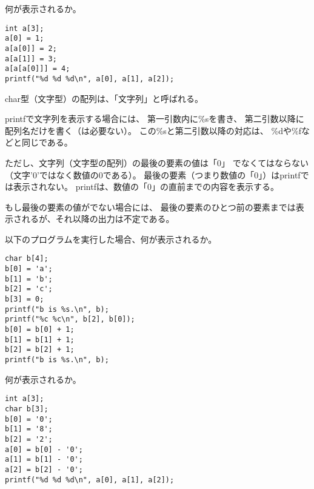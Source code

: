 \documentclass[12pt,a4j]{jarticle}
\newcounter{toi}
\def\toi{%
\bigskip\bigskip\noindent
\addtocounter{toi}{1}
\shadowbox{\bfseries\large 問\thetoi}
\nopagebreak[4]\bigskip\nopagebreak[4]
}
\begin{document}
何が表示されるか。
\begin{verbatim}
int a[3];
a[0] = 1;
a[a[0]] = 2;
a[a[1]] = 3;
a[a[a[0]]] = 4;
printf("%d %d %d\n", a[0], a[1], a[2]);
\end{verbatim}








\toi


char型（文字型）の配列は、「{\ttfamily 文字列}」と呼ばれる。



{\ttfamily printf}で文字列を表示する場合には、
第一引数内に{\ttfamily \%s}を書き、
第二引数以降に配列名だけを書く（{\ttfamily []}は必要ない）。
この{\ttfamily \%s}と第二引数以降の対応は、
{\ttfamily \%d}や{\ttfamily \%f}などと同じである。

ただし、文字列（文字型の配列）の最後の要素の値は「0」
でなくてはならない（文字{\ttfamily '0'}ではなく数値の0である）。
最後の要素（つまり数値の「0」）は{\ttfamily printf}では表示されない。
{\ttfamily printf}は、数値の「0」の直前までの内容を表示する。

もし最後の要素の値が{}でない場合には、
最後の要素のひとつ前の要素までは表示されるが、それ以降の出力は不定である。




以下のプログラムを実行した場合、何が表示されるか。
\begin{verbatim}
char b[4];
b[0] = 'a';
b[1] = 'b';
b[2] = 'c';
b[3] = 0;
printf("b is %s.\n", b);
printf("%c %c\n", b[2], b[0]);
b[0] = b[0] + 1;
b[1] = b[1] + 1;
b[2] = b[2] + 1;
printf("b is %s.\n", b);
\end{verbatim}






\toi

何が表示されるか。
\begin{verbatim}
int a[3];
char b[3];
b[0] = '0';
b[1] = '8';
b[2] = '2';
a[0] = b[0] - '0';
a[1] = b[1] - '0';
a[2] = b[2] - '0';
printf("%d %d %d\n", a[0], a[1], a[2]);
\end{verbatim}
\end{document}
